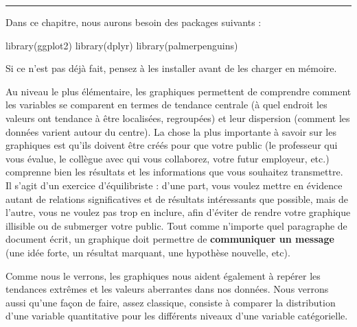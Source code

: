 \documentclass[
  letterpaper,
  DIV=11,
  numbers=noendperiod]{scrreprt}
\newenvironment{Shaded}{\begin{snugshade}}{\end{snugshade}}
\newcommand{\FunctionTok}[1]{\textcolor[rgb]{0.28,0.35,0.67}{#1}}
\newcommand{\NormalTok}[1]{\textcolor[rgb]{0.00,0.23,0.31}{#1}}
\begin{document}
\begin{center}\rule{0.5\linewidth}{0.5pt}\end{center}

Dans ce chapitre, nous aurons besoin des packages suivants :

\begin{Shaded}
\begin{Highlighting}[]
\FunctionTok{library}\NormalTok{(ggplot2)}
\FunctionTok{library}\NormalTok{(dplyr)}
\FunctionTok{library}\NormalTok{(palmerpenguins)}
\end{Highlighting}
\end{Shaded}

Si ce n'est pas déjà fait, pensez à les installer avant de les charger
en mémoire.

Au niveau le plus élémentaire, les graphiques permettent de comprendre
comment les variables se comparent en termes de tendance centrale (à
quel endroit les valeurs ont tendance à être localisées, regroupées) et
leur dispersion (comment les données varient autour du centre). La chose
la plus importante à savoir sur les graphiques est qu'ils doivent être
créés pour que votre public (le professeur qui vous évalue, le collègue
avec qui vous collaborez, votre futur employeur, etc.) comprenne bien
les résultats et les informations que vous souhaitez transmettre. Il
s'agit d'un exercice d'équilibriste : d'une part, vous voulez mettre en
évidence autant de relations significatives et de résultats intéressants
que possible, mais de l'autre, vous ne voulez pas trop en inclure, afin
d'éviter de rendre votre graphique illisible ou de submerger votre
public. Tout comme n'importe quel paragraphe de document écrit, un
graphique doit permettre de \textbf{communiquer un message} (une idée
forte, un résultat marquant, une hypothèse nouvelle, etc).

Comme nous le verrons, les graphiques nous aident également à repérer
les tendances extrêmes et les valeurs aberrantes dans nos données. Nous
verrons aussi qu'une façon de faire, assez classique, consiste à
comparer la distribution d'une variable quantitative pour les différents
niveaux d'une variable catégorielle.
\end{document}
